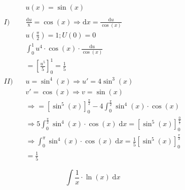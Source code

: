 \begin{uebung}
	\begin{solution}
		\begin{align*}
			         & u(x) = \sin(x)                                                                                                                  \\
			\\
			I)\quad  & \frac{\mathrm{d}u}{\mathrm{x}} = \cos(x) \Rightarrow \mathrm{d}x = \frac{\mathrm{d}u}{\cos(x)}                                  \\
			         & u(\frac{\pi}{2}) = 1; U(0) = 0                                                                                                  \\
			         & \int_0^1 u^4 \cdot \cos(x) \cdot \frac{\mathrm{d}u}{\cos(x)}                                                                    \\
			         & = {\left[ \frac{u^5}{5} \right]}_0^1 = \frac{1}{5}                                                                              \\
			II)\quad & u = \sin^4(x) \Rightarrow u' = 4 \sin^3 (x)                                                                                     \\
			         & v' = \cos(x) \Rightarrow v = \sin(x)                                                                                            \\
			         & \Rightarrow = {\left[ \sin^5(x) \right]}_0^{\frac{\pi}{2}} - 4 \int_0^{\frac{\pi}{2}} \sin^4 (x) \cdot \cos(x)                  \\
			         & \Rightarrow 5 \int_0^\frac{\pi}{2} \sin^4(x) \cdot \cos(x) \;\mathrm{d}x = {\left[ \sin^5(x) \right]}_0^\frac{0}{\frac{\pi}{2}} \\
			         & \Rightarrow \int_0^\pi \sin^4(x) \cdot \cos(x) \;\mathrm{d}x = \frac{1}{5} {\left[ \sin^5(x) \right]}_0^\frac{\pi}{2}           \\
			         & = \frac{1}{5}
		\end{align*}
	\end{solution}

	\begin{question}
		\[
			\int \frac{1}{x} \cdot \ln(x) \;\mathrm{d}x
		\]
	\end{question}


\end{uebung}
